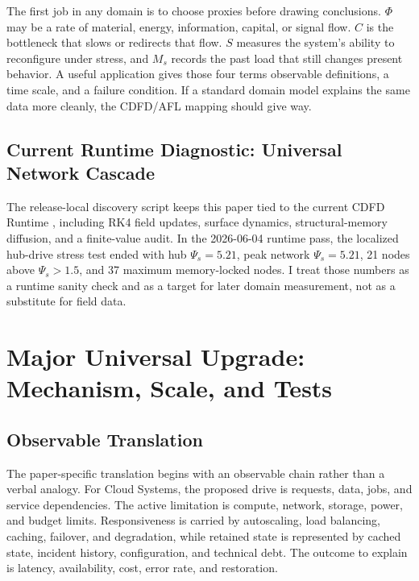 \documentclass[11pt,a4paper]{article}
\begin{document}
The first job in any domain is to choose proxies before drawing conclusions. $\Phi$ may be a rate of material, energy, information, capital, or signal flow. $C$ is the bottleneck that slows or redirects that flow. $S$ measures the system's ability to reconfigure under stress, and $M_s$ records the past load that still changes present behavior. A useful application gives those four terms observable definitions, a time scale, and a failure condition. If a standard domain model explains the same data more cleanly, the CDFD/AFL mapping should give way.

\subsection{Current Runtime Diagnostic: Universal Network Cascade}
The release-local discovery script keeps this paper tied to the current CDFD Runtime \cite{CDFDRuntime2026}, including RK4 field updates, surface dynamics, structural-memory diffusion, and a finite-value audit. In the 2026-06-04 runtime pass, the localized hub-drive stress test ended with hub $\Psi_s=5.21$, peak network $\Psi_s=5.21$, 21 nodes above $\Psi_s>1.5$, and 37 maximum memory-locked nodes. I treat those numbers as a runtime sanity check and as a target for later domain measurement, not as a substitute for field data.


\section{Major Universal Upgrade: Mechanism, Scale, and Tests}

\subsection{Observable Translation}

The paper-specific translation begins with an observable chain rather than a
verbal analogy. For Cloud Systems, the proposed drive is requests, data, jobs, and service dependencies.
The active limitation is compute, network, storage, power, and budget limits. Responsiveness is carried by
autoscaling, load balancing, caching, failover, and degradation, while retained state is represented by
cached state, incident history, configuration, and technical debt. The outcome to explain is latency, availability, cost, error rate, and restoration.
\end{document}
